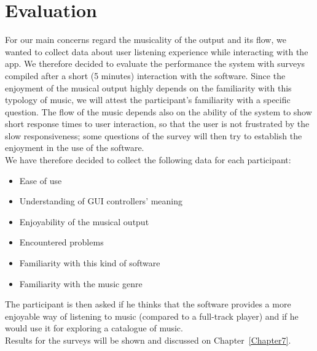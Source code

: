 \section{Evaluation}
\label{sec:evaluation_idea}
For our main concerns regard the musicality of the output and its flow, we wanted to collect data about user listening experience while interacting with the app. We therefore decided to evaluate the performance the system with surveys compiled after a short (5 minutes) interaction with the software. Since the enjoyment of the musical output highly depends on the familiarity with this typology of music, we will attest the participant's familiarity with a specific question. The flow of the music depends also on the ability of the system to show short response times to user interaction, so that the user is not frustrated by the slow responsiveness; some questions of the survey will then try to establish the enjoyment in the use of the software.\\
We have therefore decided to collect the following data for each participant:
\begin{itemize}
\item Ease of use
\item Understanding of GUI controllers' meaning
\item Enjoyability of the musical output
\item Encountered problems
\item Familiarity with this kind of software
\item Familiarity with the music genre 
\end{itemize}

The participant is then asked if he thinks that the software provides a more enjoyable way of listening to music (compared to a full-track player) and if he would use it for exploring a catalogue of music. \\
Results for the surveys will be shown and discussed on Chapter~\ref{Chapter7}.